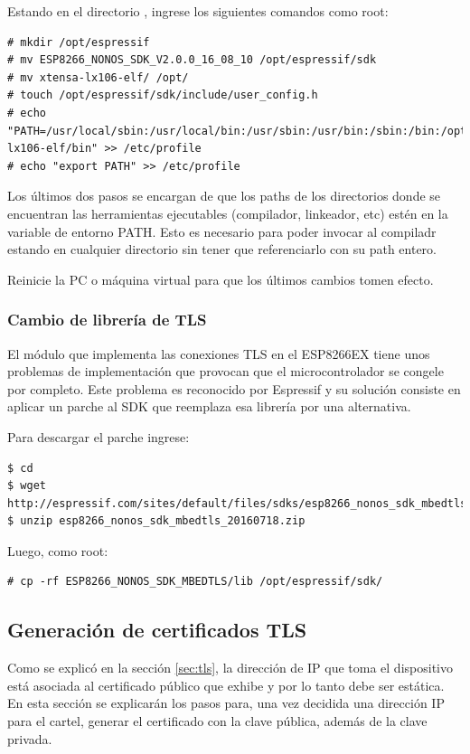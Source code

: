 Estando en el directorio , ingrese los siguientes comandos como root:
\begin{lstlisting}
# mkdir /opt/espressif
# mv ESP8266_NONOS_SDK_V2.0.0_16_08_10 /opt/espressif/sdk
# mv xtensa-lx106-elf/ /opt/
# touch /opt/espressif/sdk/include/user_config.h
# echo "PATH=/usr/local/sbin:/usr/local/bin:/usr/sbin:/usr/bin:/sbin:/bin:/opt/xtensa-lx106-elf/bin" >> /etc/profile
# echo "export PATH" >> /etc/profile
\end{lstlisting}

Los últimos dos pasos se encargan de que los paths de los directorios donde se encuentran las herramientas ejecutables (compilador, linkeador, etc) estén en la variable de entorno PATH. Esto es necesario para poder invocar al compiladr estando en cualquier directorio sin tener que referenciarlo con su path entero.

Reinicie la PC o máquina virtual para que los últimos cambios tomen efecto.

\subsubsection{Cambio de librería de TLS}
El módulo que implementa las conexiones TLS en el ESP8266EX tiene unos problemas de implementación que provocan que el microcontrolador se congele por completo. Este problema es reconocido por Espressif y su solución consiste en aplicar un parche al SDK que reemplaza esa librería por una alternativa.

Para descargar el parche ingrese:
\begin{lstlisting}
$ cd
$ wget http://espressif.com/sites/default/files/sdks/esp8266_nonos_sdk_mbedtls_20160718.zip
$ unzip esp8266_nonos_sdk_mbedtls_20160718.zip
\end{lstlisting}

Luego, como root:

\begin{lstlisting}
# cp -rf ESP8266_NONOS_SDK_MBEDTLS/lib /opt/espressif/sdk/
\end{lstlisting}


\subsection{Generación de certificados TLS}\label{sec:cert-gen}
Como se explicó en la sección \ref{sec:tls}, la dirección de IP que toma el dispositivo está asociada al certificado público que exhibe y por lo tanto debe ser estática. En esta sección se explicarán los pasos para, una vez decidida una dirección IP para el cartel, generar el certificado con la clave pública, además de la clave privada.

